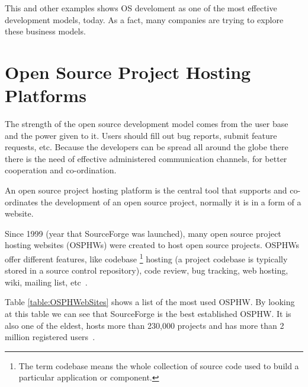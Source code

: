 This and other examples shows OS develoment as one of the most effective development models, today. 
As a fact, many companies are trying to explore these business models.


\section{Open Source Project Hosting Platforms}

The strength of the open source development model comes from the user base and the power given to it. 
Users should fill out bug reports, submit feature requests, etc. 
Because the developers can be spread all around the globe there there is the need of effective administered communication channels,
for better cooperation and co-ordination. 

An open source project hosting platform is the central tool that supports and co-ordinates the development of an open source project,
normally it is in a form of a website.

Since 1999 (year that SourceForge was launched), many open source project hosting websites (OSPHWs) were created to host open source projects.
OSPHWs offer different features, 
like codebase \footnote{The term codebase means the whole collection of source code used to build a particular application or component.} 
hosting (a project codebase is typically stored in a source control repository), 
code review, bug tracking, web hosting, wiki, mailing list, etc~\cite{binkley2006animated}.



Table \ref{table:OSPHWebSites} shows a list of the most used OSPHW.
By looking at this table we can see that SourceForge is the best established OSPHW.
It is also one of the eldest, 
hosts more than 230,000 projects and has more than 2 million registered users~\cite{christley2005collection}.

